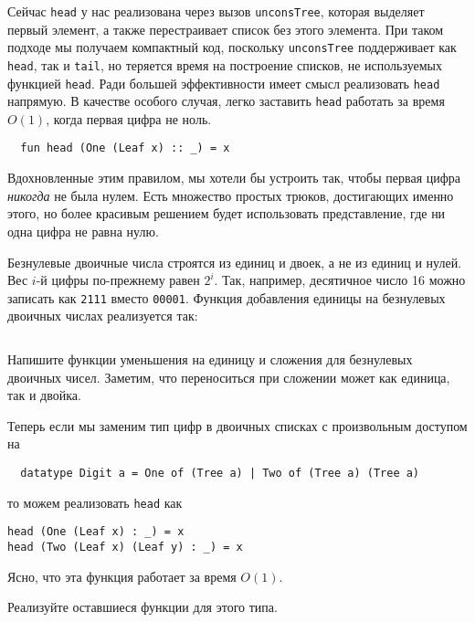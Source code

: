 \begin{frame}[fragile]{}
Сейчас \lstinline!head! у нас реализована через вызов
\lstinline!unconsTree!, которая выделяет первый элемент, а также
перестраивает список без этого элемента. При таком подходе мы получаем
компактный код, поскольку \lstinline!unconsTree! поддерживает как
\lstinline!head!, так и \lstinline!tail!, но теряется время
на построение списков, не используемых функцией
\lstinline!head!. Ради большей эффективности имеет смысл реализовать
\lstinline!head! напрямую. В качестве особого случая, легко заставить
\lstinline!head! работать за время $O(1)$, когда первая цифра не ноль.
\begin{lstlisting}
  fun head (One (Leaf x) :: _) = x
\end{lstlisting}
Вдохновленные этим правилом, мы хотели бы устроить так, чтобы первая
цифра \emph{никогда} не была нулем. Есть множество простых трюков,
достигающих именно этого, но более красивым решением будет
использовать  представление, где ни одна
цифра не равна нулю.
\end{frame}

\begin{frame}[fragile]{}
Безнулевые двоичные числа строятся из единиц и двоек, а не из единиц и
нулей. Вес $i$-й цифры по-прежнему равен $2^i$. Так, например,
десятичное число 16 можно записать как \texttt{2111} вместо
\texttt{00001}. Функция добавления единицы на безнулевых двоичных
числах реализуется так:
\inputminted[firstline=3,lastline=8]{haskell}{code/ZerolessNumbers.hs}

\begin{exercise}\label{ex:9.4}
  Напишите функции уменьшения на единицу и сложения для безнулевых
  двоичных чисел. Заметим, что переноситься при сложении может как
  единица, так и двойка.
\end{exercise}
\end{frame}

\begin{frame}[fragile]{}
Теперь если мы заменим тип цифр в двоичных списках с произвольным
доступом на
\begin{verbatim}
  datatype Digit a = One of (Tree a) | Two of (Tree a) (Tree a)
\end{verbatim}
то можем реализовать \lstinline!head! как
\begin{verbatim}
head (One (Leaf x) : _) = x
head (Two (Leaf x) (Leaf y) : _) = x
\end{verbatim}
Ясно, что эта функция работает за время $O(1)$.

\begin{exercise}\label{ex:9.5}
  Реализуйте оставшиеся функции для этого типа.
\end{exercise}

\end{frame}

